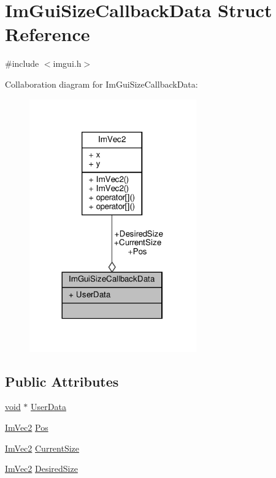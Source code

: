 \hypertarget{structImGuiSizeCallbackData}{}\section{Im\+Gui\+Size\+Callback\+Data Struct Reference}
\label{structImGuiSizeCallbackData}


{\ttfamily \#include $<$imgui.\+h$>$}



Collaboration diagram for Im\+Gui\+Size\+Callback\+Data\+:
\nopagebreak
\begin{figure}[H]
\begin{center}
\leavevmode
\includegraphics[width=204pt]{structImGuiSizeCallbackData__coll__graph}
\end{center}
\end{figure}
\subsection*{Public Attributes}
\begin{DoxyCompactItemize}
\item 
\hyperlink{imgui__impl__opengl3__loader_8h_ac668e7cffd9e2e9cfee428b9b2f34fa7}{void} $\ast$ \hyperlink{structImGuiSizeCallbackData_ae16a4a1b916810b2f69925c527430a39}{User\+Data}
\item 
\hyperlink{structImVec2}{Im\+Vec2} \hyperlink{structImGuiSizeCallbackData_a64fc0959664ddba84e051baaeaa9a042}{Pos}
\item 
\hyperlink{structImVec2}{Im\+Vec2} \hyperlink{structImGuiSizeCallbackData_ac26746d231819ccb5a274ff78c6fa64e}{Current\+Size}
\item 
\hyperlink{structImVec2}{Im\+Vec2} \hyperlink{structImGuiSizeCallbackData_a42be6d99a279942b4f2019a4416f65ba}{Desired\+Size}
\end{DoxyCompactItemize}


